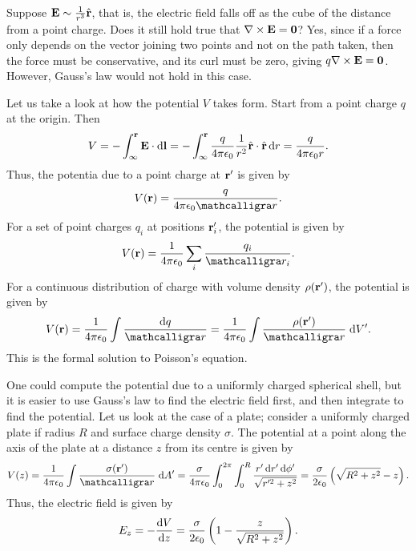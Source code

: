 Suppose $\mathbf{E} \sim \frac{1}{r^{3}} \hat{\mathbf{r}}$, that is, the electric field falls off as the cube of the distance from a point charge. Does it still hold true that $\nabla \times \mathbf{E} = \mathbf{0}$? Yes, since if a force only depends on the vector joining two points and not on the path taken, then the force must be conservative, and its curl must be zero, giving $q \nabla \times \mathbf{E} = \mathbf{0}$. However, Gauss's law would not hold in this case.

Let us take a look at how the potential $V$ takes form. Start from a point charge $q$ at the origin. Then
\begin{align}
    V = - \int_{\infty}^{\mathbf{r}} \mathbf{E} \cdot \mathrm{d}\mathbf{l} = - \int_{\infty}^{\mathbf{r}} \frac{q}{4 \pi \epsilon_{0}} \frac{1}{r^{2}} \hat{\mathbf{r}} \cdot \hat{\mathbf{r}} \, \mathrm{d}r = \frac{q}{4 \pi \epsilon_{0} r}.
\end{align}
Thus, the potentia due to a point charge at $\mathbf{r}'$ is given by
\begin{align}
    V(\bv{r}) = \frac{q}{4 \pi \epsilon_{0} \curs{r}}.
\end{align}
For a set of point charges $q_{i}$ at positions $\mathbf{r}_{i}'$, the potential is given by
\begin{align}
    V(\bv{r}) = \frac{1}{4 \pi \epsilon_{0}} \sum_{i} \frac{q_{i}}{\curs{r}_{i}}.
\end{align}
For a continuous distribution of charge with volume density $\rho(\mathbf{r}')$, the potential is given by
\begin{align}
    V(\bv{r}) = \frac{1}{4 \pi \epsilon_{0}} \int \frac{\di{q}}{\curs{r}} = \frac{1}{4 \pi \epsilon_{0}} \int \frac{\rho(\bv{r}')}{\curs{r}} \; \di{V}'.
\end{align}
This is the formal solution to Poisson's equation.

One could compute the potential due to a uniformly charged spherical shell, but it is easier to use Gauss's law to find the electric field first, and then integrate to find the potential. Let us look at the case of a plate; consider a uniformly charged plate if radius $R$ and surface charge density $\sigma$. The potential at a point along the axis of the plate at a distance $z$ from its centre is given by
\begin{align}
    V(z) = \frac{1}{4 \pi \epsilon_{0}} \int \frac{\sigma(\bv{r}')}{\curs{r}} \; \di{A}' = \frac{\sigma}{4 \pi \epsilon_{0}} \int_{0}^{2 \pi} \int_{0}^{R} \frac{r' \, \di{r}' \, \di{\phi}'}{\sqrt{r'^{2} + z^{2}}} = \frac{\sigma}{2 \epsilon_{0}} \left( \sqrt{R^{2} + z^{2}} - z \right).
\end{align}
Thus, the electric field is given by
\begin{align}
    E_{z} = - \frac{\mathrm{d}V}{\mathrm{d}z} = \frac{\sigma}{2 \epsilon_{0}} \left( 1 - \frac{z}{\sqrt{R^{2} + z^{2}}} \right).
\end{align}

